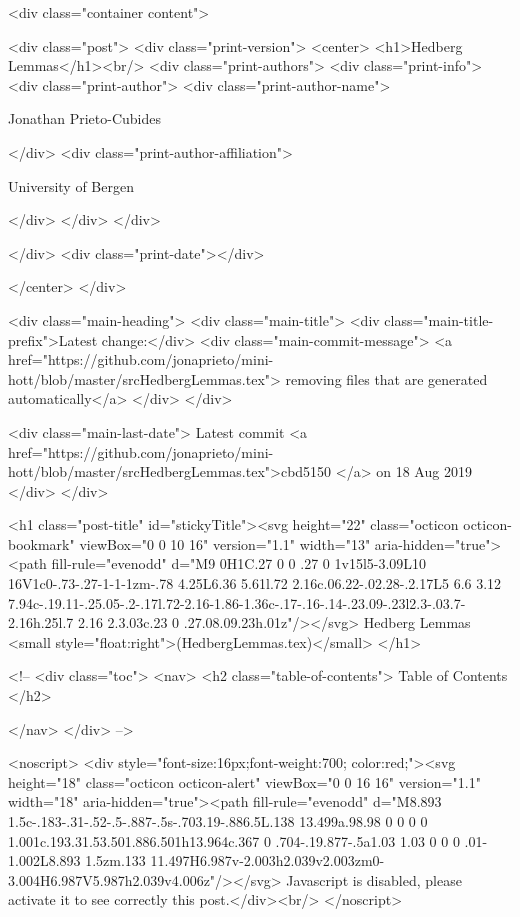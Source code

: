       <div class="container content">
        







<div class="post">
  <div class="print-version">
    <center>
      <h1>Hedberg Lemmas</h1><br/>
        <div class="print-authors">
          <div class="print-info">
            <div class="print-author">
              <div class="print-author-name">
                
                  Jonathan Prieto-Cubides
                
              </div>
              <div class="print-author-affiliation">
                
                  University of Bergen
                
                </div>
            </div>
          </div>
          
          
        </div>
        <div class="print-date"></div>
        
        
    </center>
  </div>

  
  <div class="main-heading">
    <div class="main-title">
      <div class="main-title-prefix">Latest change:</div>
      <div class="main-commit-message">
            <a href="https://github.com/jonaprieto/mini-hott/blob/master/srcHedbergLemmas.tex">
              removing files that are generated automatically</a>
      </div>
    </div>

    <div class="main-last-date">
      Latest commit <a href="https://github.com/jonaprieto/mini-hott/blob/master/srcHedbergLemmas.tex">cbd5150 </a> on  18 Aug 2019
    </div>
  </div>
  

  <h1 class="post-title" id="stickyTitle"><svg height="22" class="octicon octicon-bookmark" viewBox="0 0 10 16" version="1.1" width="13" aria-hidden="true"><path fill-rule="evenodd" d="M9 0H1C.27 0 0 .27 0 1v15l5-3.09L10 16V1c0-.73-.27-1-1-1zm-.78 4.25L6.36 5.61l.72 2.16c.06.22-.02.28-.2.17L5 6.6 3.12 7.94c-.19.11-.25.05-.2-.17l.72-2.16-1.86-1.36c-.17-.16-.14-.23.09-.23l2.3-.03.7-2.16h.25l.7 2.16 2.3.03c.23 0 .27.08.09.23h.01z"/></svg> Hedberg Lemmas <small style="float:right">(HedbergLemmas.tex)</small>
  </h1>

  <!-- 
  <div class="toc">
    <nav>
    <h2 class="table-of-contents"> Table of Contents </h2>
      

    </nav>
  </div>
   -->

  <noscript>
  <div style="font-size:16px;font-weight:700; color:red;"><svg height="18" class="octicon octicon-alert" viewBox="0 0 16 16" version="1.1" width="18" aria-hidden="true"><path fill-rule="evenodd" d="M8.893 1.5c-.183-.31-.52-.5-.887-.5s-.703.19-.886.5L.138 13.499a.98.98 0 0 0 0 1.001c.193.31.53.501.886.501h13.964c.367 0 .704-.19.877-.5a1.03 1.03 0 0 0 .01-1.002L8.893 1.5zm.133 11.497H6.987v-2.003h2.039v2.003zm0-3.004H6.987V5.987h2.039v4.006z"/></svg> Javascript is disabled, please activate it to see correctly this post.</div><br/>
  </noscript>


